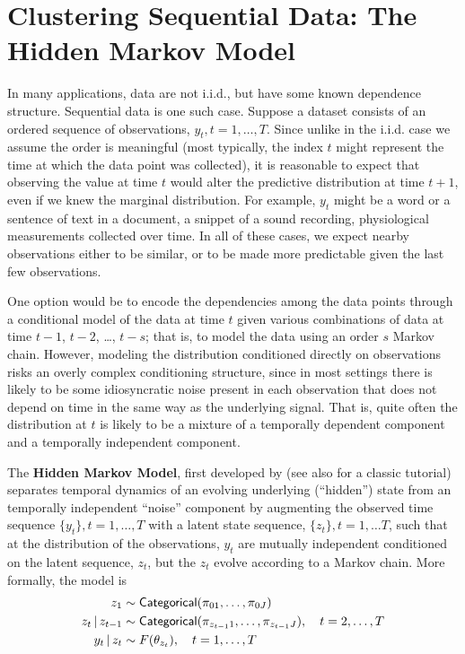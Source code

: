 \section{Clustering Sequential Data: The Hidden Markov Model}

In many applications, data are not i.i.d., but have some known
dependence structure.  Sequential data is one such case.  Suppose a
dataset consists of an ordered sequence of observations, ${y_t}, t =
1, \dots, T$.  Since unlike in the i.i.d. case we assume the order is
meaningful (most typically, the index $t$ might represent the time at which the data
point was collected), it is reasonable to expect that observing the
value at time $t$ would alter the predictive distribution at time
$t+1$, even if we knew the marginal distribution.  For example, $y_t$
might be a word or a sentence of text in a document, a snippet of a
sound recording, physiological measurements collected over time.  In
all of these cases, we expect nearby observations either to be
similar, or to be made more predictable given the last few observations.

One option would be to encode the dependencies among the data points
through a conditional model of the data at time $t$ given various
combinations of data at time $t-1$, $t-2$, \dots, $t-s$; that is, to
model the data using an order $s$ Markov chain. However, modeling the
distribution conditioned directly on observations risks an overly
complex conditioning structure, since in most settings there is likely
to be some idiosyncratic noise present in each observation that does
not depend on time in the same way as the underlying signal.  That is,
quite often the distribution at $t$ is likely to be a mixture of a temporally dependent
component and a temporally independent component.

The {\bf Hidden Markov Model}, first developed by
\citet{baum1966statistical} (see also \citet{rabiner1986introduction}
for a classic tutorial) separates temporal dynamics of an evolving
underlying (``hidden'') state from an temporally independent ``noise''
component by augmenting the observed time sequence $\{y_t\}, t = 1,
\dots, T$ with a latent state sequence, $\{z_t\}, t = 1,
\dots T$, such that at the distribution of the observations, $y_t$ are
mutually independent conditioned on the latent sequence, $z_t$, but the $z_t$
evolve according to a Markov chain.  More formally, the model is
\begin{align}
  z_1 &\sim \mathsf{Categorical}(\pi_{01}, \dots, \pi_{0J}) \\
  z_t \, \vert \, z_{t-1} &\sim \mathsf{Categorical}(\pi_{z_{t-1}1}, \dots,
    \pi_{z_{t-1}J}), \quad t = 2, \dots, T
  \\
  y_t \, \vert \, z_t &\sim F(\theta_{z_t}), \quad t = 1, \dots, T
\end{align}

